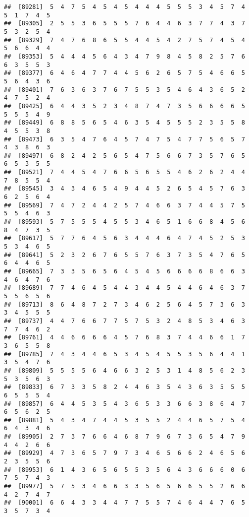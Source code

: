 \documentclass[
]{book}
\begin{document}
\begin{verbatim}
##  [89281]  5  4  7  5  4  5  4  5  4  4  4  5  5  5  3  4  5  7  4  5  1  7  4  5
##  [89305]  2  5  5  3  6  5  5  5  7  6  4  4  6  3  7  7  4  3  7  5  3  2  5  4
##  [89329]  7  4  7  6  8  6  5  5  4  4  5  4  2  7  5  7  4  5  4  5  6  6  4  4
##  [89353]  5  4  4  4  5  6  4  3  4  7  9  8  4  5  8  2  5  7  6  6  3  5  5  3
##  [89377]  6  4  6  4  7  7  4  4  5  6  2  6  5  7  5  4  6  6  5  5  6  4  3  6
##  [89401]  7  6  3  6  3  7  6  7  5  5  3  5  4  6  4  3  6  5  2  4  7  5  2  4
##  [89425]  6  4  4  3  5  2  3  4  8  7  4  7  3  5  6  6  6  6  5  5  5  5  4  9
##  [89449]  6  8  8  5  6  5  4  6  3  5  4  5  5  5  2  3  5  5  8  4  5  5  3  8
##  [89473]  6  3  5  4  7  6  4  5  7  4  7  5  4  7  7  5  6  5  7  4  3  8  6  3
##  [89497]  6  8  2  4  2  5  6  5  4  7  5  6  6  7  3  5  7  6  5  6  5  3  5  5
##  [89521]  7  4  4  5  4  7  6  6  5  6  5  5  4  6  2  6  2  4  4  7  8  5  5  4
##  [89545]  3  4  3  4  6  5  4  9  4  4  5  2  6  5  4  5  7  6  3  6  2  5  6  4
##  [89569]  7  4  7  2  4  4  2  5  7  4  6  6  3  7  4  4  5  7  5  5  5  4  6  3
##  [89593]  5  7  5  5  5  4  5  5  3  4  6  5  1  6  6  8  4  5  6  8  4  7  3  5
##  [89617]  5  7  7  6  4  5  6  3  4  4  4  6  4  7  4  5  2  5  3  5  3  4  6  5
##  [89641]  5  2  3  2  6  7  6  5  5  7  6  3  7  3  5  4  7  6  5  6  4  4  6  5
##  [89665]  7  3  3  5  6  5  6  4  5  4  5  6  6  6  6  8  6  6  3  4  6  4  7  6
##  [89689]  7  7  4  6  4  5  4  4  3  4  4  5  4  4  6  4  6  3  7  5  5  6  5  6
##  [89713]  8  6  4  8  7  2  7  3  4  6  2  5  6  4  5  7  3  6  3  3  4  5  5  5
##  [89737]  4  4  7  6  6  7  7  5  7  5  3  2  4  8  5  3  4  6  3  7  7  4  6  2
##  [89761]  4  4  6  6  6  6  4  5  7  6  8  3  7  4  4  6  6  1  7  3  6  5  5  8
##  [89785]  7  4  3  4  4  6  5  3  4  5  4  5  5  3  5  6  4  4  1  3  5  4  7  6
##  [89809]  5  5  5  5  6  4  6  6  3  2  5  3  1  4  8  5  6  2  3  5  3  5  6  3
##  [89833]  6  7  3  3  5  8  2  4  4  6  3  5  4  3  6  3  5  5  5  6  5  5  5  4
##  [89857]  6  4  4  5  3  5  4  3  6  5  3  3  6  6  3  8  6  4  7  6  5  6  2  5
##  [89881]  5  4  3  4  7  4  4  5  3  5  5  2  4  4  6  5  7  5  4  6  4  3  4  6
##  [89905]  2  7  3  7  6  6  4  6  8  7  9  6  7  3  6  5  4  7  9  4  4  2  6  6
##  [89929]  4  7  3  6  5  7  9  7  3  4  6  5  6  6  2  4  6  5  6  2  3  5  5  6
##  [89953]  6  1  4  3  6  5  6  5  5  3  5  6  4  3  6  6  6  0  6  7  5  7  4  3
##  [89977]  5  7  5  3  4  6  6  3  3  5  6  5  6  6  5  5  2  6  6  4  2  7  4  7
##  [90001]  6  6  4  3  3  4  4  7  7  5  5  7  4  6  4  4  7  6  5  3  5  7  3  4

\end{verbatim}
\end{document}
